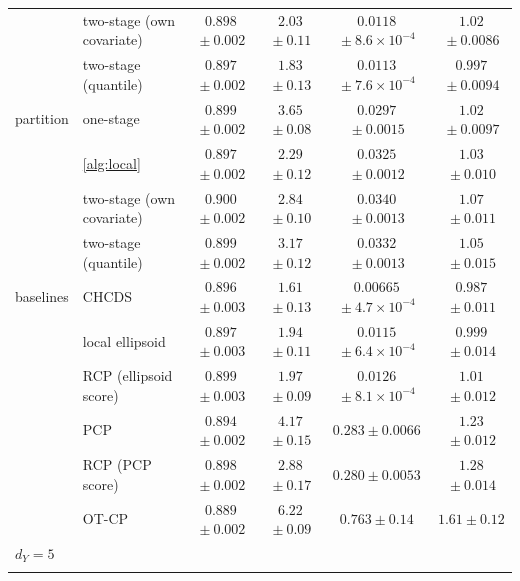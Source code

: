 \begin{table}[!t]
{\begin{tabular}{llcccc}
 & two-stage (own covariate) & $0.898${\scriptsize${}\pm0.002$} & $2.03${\scriptsize${}\pm0.11$} & $0.0118${\scriptsize${}\pm8.6\times10^{-4}$} & $1.02${\scriptsize${}\pm0.0086$}\\
 & two-stage (quantile) & $0.897${\scriptsize${}\pm0.002$} & $1.83${\scriptsize${}\pm0.13$} & $0.0113${\scriptsize${}\pm7.6\times10^{-4}$} & $0.997${\scriptsize${}\pm0.0094$}\\
\addlinespace[2pt]
partition & one-stage & $0.899${\scriptsize${}\pm0.002$} & $3.65${\scriptsize${}\pm0.08$} & $0.0297${\scriptsize${}\pm0.0015$} & $1.02${\scriptsize${}\pm0.0097$}\\
 & \cref{alg:local} & $0.897${\scriptsize${}\pm0.002$} & $2.29${\scriptsize${}\pm0.12$} & $0.0325${\scriptsize${}\pm0.0012$} & $1.03${\scriptsize${}\pm0.010$}\\
 & two-stage (own covariate) & $0.900${\scriptsize${}\pm0.002$} & $2.84${\scriptsize${}\pm0.10$} & $0.0340${\scriptsize${}\pm0.0013$} & $1.07${\scriptsize${}\pm0.011$}\\
 & two-stage (quantile) & $0.899${\scriptsize${}\pm0.002$} & $3.17${\scriptsize${}\pm0.12$} & $0.0332${\scriptsize${}\pm0.0013$} & $1.05${\scriptsize${}\pm0.015$}\\
\addlinespace[2pt]
baselines & CHCDS & $0.896${\scriptsize${}\pm0.003$} & $1.61${\scriptsize${}\pm0.13$} & $0.00665${\scriptsize${}\pm4.7\times10^{-4}$} & $0.987${\scriptsize${}\pm0.011$}\\
 & local ellipsoid & $0.897${\scriptsize${}\pm0.003$} & $1.94${\scriptsize${}\pm0.11$} & $0.0115${\scriptsize${}\pm6.4\times10^{-4}$} & $0.999${\scriptsize${}\pm0.014$}\\
 & RCP (ellipsoid score) & $0.899${\scriptsize${}\pm0.003$} & $1.97${\scriptsize${}\pm0.09$} & $0.0126${\scriptsize${}\pm8.1\times10^{-4}$} & $1.01${\scriptsize${}\pm0.012$}\\
 & PCP & $0.894${\scriptsize${}\pm0.002$} & $4.17${\scriptsize${}\pm0.15$} & $0.283${\scriptsize${}\pm0.0066$} & $1.23${\scriptsize${}\pm0.012$}\\
 & RCP (PCP score) & $0.898${\scriptsize${}\pm0.002$} & $2.88${\scriptsize${}\pm0.17$} & $0.280${\scriptsize${}\pm0.0053$} & $1.28${\scriptsize${}\pm0.014$}\\
 & OT-CP & $0.889${\scriptsize${}\pm0.002$} & $6.22${\scriptsize${}\pm0.09$} & $0.763${\scriptsize${}\pm0.14$} & $1.61${\scriptsize${}\pm0.12$}\\
\midrule
\multicolumn{6}{l}{$d_Y=5$}\\
\addlinespace[2pt]

\end{tabular}}
\end{table}
